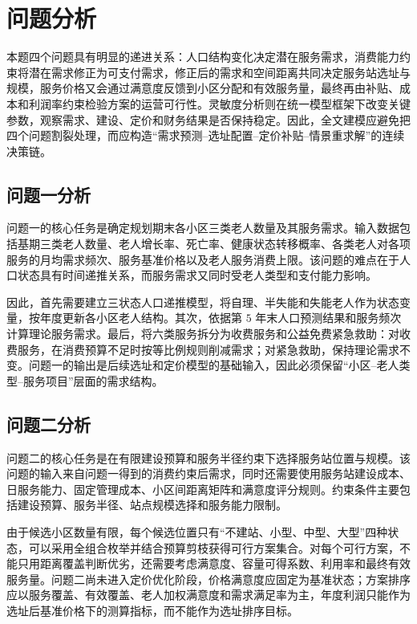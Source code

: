 \section{问题分析}

本题四个问题具有明显的递进关系：人口结构变化决定潜在服务需求，消费能力约束将潜在需求修正为可支付需求，修正后的需求和空间距离共同决定服务站选址与规模，服务价格又会通过满意度反馈到小区分配和有效服务量，最终再由补贴、成本和利润率约束检验方案的运营可行性。灵敏度分析则在统一模型框架下改变关键参数，观察需求、建设、定价和财务结果是否保持稳定。因此，全文建模应避免把四个问题割裂处理，而应构造“需求预测--选址配置--定价补贴--情景重求解”的连续决策链。

\subsection{问题一分析}

问题一的核心任务是确定规划期末各小区三类老人数量及其服务需求。输入数据包括基期三类老人数量、老人增长率、死亡率、健康状态转移概率、各类老人对各项服务的月均需求频次、服务基准价格以及老人服务消费上限。该问题的难点在于人口状态具有时间递推关系，而服务需求又同时受老人类型和支付能力影响。

因此，首先需要建立三状态人口递推模型，将自理、半失能和失能老人作为状态变量，按年度更新各小区老人结构。其次，依据第 $5$ 年末人口预测结果和服务频次计算理论服务需求。最后，将六类服务拆分为收费服务和公益免费紧急救助：对收费服务，在消费预算不足时按等比例规则削减需求；对紧急救助，保持理论需求不变。问题一的输出是后续选址和定价模型的基础输入，因此必须保留“小区--老人类型--服务项目”层面的需求结构。

\subsection{问题二分析}

问题二的核心任务是在有限建设预算和服务半径约束下选择服务站位置与规模。该问题的输入来自问题一得到的消费约束后需求，同时还需要使用服务站建设成本、日服务能力、固定管理成本、小区间距离矩阵和满意度评分规则。约束条件主要包括建设预算、服务半径、站点规模选择和服务能力限制。

由于候选小区数量有限，每个候选位置只有“不建站、小型、中型、大型”四种状态，可以采用全组合枚举并结合预算剪枝获得可行方案集合。对每个可行方案，不能只用距离覆盖判断优劣，还需要考虑满意度、容量可得系数、利用率和最终有效服务量。问题二尚未进入定价优化阶段，价格满意度应固定为基准状态；方案排序应以服务覆盖、有效覆盖、老人加权满意度和需求满足率为主，年度利润只能作为选址后基准价格下的测算指标，而不能作为选址排序目标。

